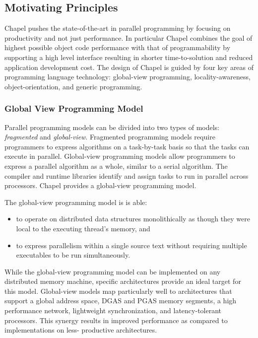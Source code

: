 \subsection{Motivating Principles}
\label{Motivating_Principles}

Chapel pushes the state-of-the-art in parallel programming
by focusing on productivity and not just performance. In particular
Chapel combines the goal of highest possible
object code performance with that of programmability
by supporting a high level interface resulting in
shorter time-to-solution and reduced application development
cost. The design of Chapel is guided by four key
areas of programming language technology: global-view programming,
locality-awareness, object-orientation, and generic
programming.

\subsubsection{Global View Programming Model}
\label{Global_View_Programming_Model}

Parallel programming models can be divided into two types of models:
{\em fragmented} and {\em global-view}.  Fragmented programming models
require programmers to express algorithms on a task-by-task basis so that
the tasks can execute in parallel.  Global-view programming models
allow programmers to express a parallel algorithm as a whole, similar to
a serial algorithm.  The compiler and runtime libraries identify and assign
tasks to run in parallel across processors.  Chapel provides a global-view 
programming model.

The global-view programming model is is able:
\begin{itemize}
\item to operate on distributed data structures monolithically as 
though they were local to the executing thread's memory, and 
\item to express parallelism within a single source text without requiring 
multiple executables to be run simultaneously. 
\end{itemize}
While the global-view programming model can be implemented on any distributed memory 
machine, specific architectures provide an ideal target for this model.  
Global-view models map particularly well to architectures that 
support a global address space, DGAS and PGAS memory segments, a high performance 
network, lightweight synchronization, and latency-tolerant processors.  This 
synergy results in improved performance as compared to implementations on less-
productive architectures.

